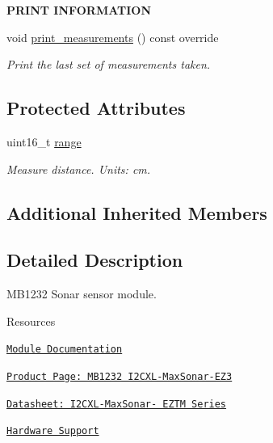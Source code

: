 \begin{Indent}{\bf P\+R\+I\+NT I\+N\+F\+O\+R\+M\+A\+T\+I\+ON}\par
\begin{DoxyCompactItemize}
\item 
void \hyperlink{class_loom___m_b1232_afce7df3f692a27fa6b452e3cc3b9cf63}{print\+\_\+measurements} () const override
\begin{DoxyCompactList}\small\item\em Print the last set of measurements taken. \end{DoxyCompactList}\end{DoxyCompactItemize}
\end{Indent}
\subsection*{Protected Attributes}
\begin{DoxyCompactItemize}
\item 
uint16\+\_\+t \hyperlink{class_loom___m_b1232_acfb38d20f72e16e517ed5cc670a4d1a8}{range}
\begin{DoxyCompactList}\small\item\em Measure distance. Units\+: cm. \end{DoxyCompactList}\end{DoxyCompactItemize}
\subsection*{Additional Inherited Members}


\subsection{Detailed Description}
M\+B1232 Sonar sensor module. 

\begin{DoxyParagraph}{Resources}

\begin{DoxyItemize}
\item \href{https://openslab-osu.github.io/Loom/html/class_loom___m_b1232.html}{\tt Module Documentation}
\item \href{https://www.maxbotix.com/Ultrasonic_Sensors/MB1232.htm}{\tt Product Page\+: M\+B1232 I2\+C\+X\+L-\/\+Max\+Sonar-\/\+E\+Z3}
\item \href{https://www.maxbotix.com/documents/I2CXL-MaxSonar-EZ_Datasheet.pdf}{\tt Datasheet\+: I2\+C\+X\+L-\/\+Max\+Sonar-\/ E\+Z\+TM Series}
\item \href{https://github.com/OPEnSLab-OSU/Loom/wiki/Hardware-Support#mb1232-sonar}{\tt Hardware Support} 
\end{DoxyItemize}
\end{DoxyParagraph}


